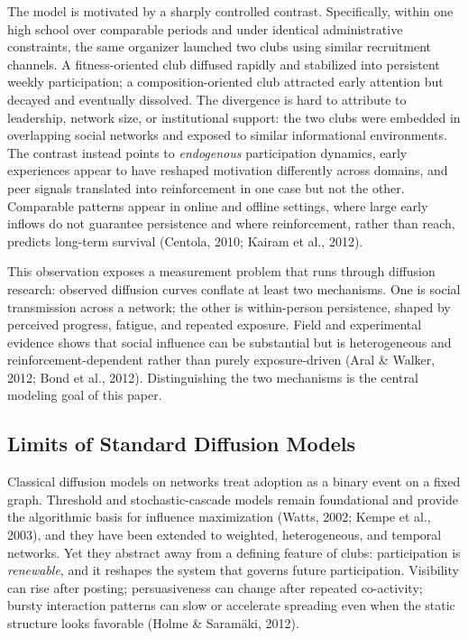 \documentclass[11pt]{article}
\begin{document}
The model is motivated by a sharply controlled contrast. Specifically, within one high school over comparable periods and under identical administrative constraints, the same organizer launched two clubs using similar recruitment channels. A fitness-oriented club diffused rapidly and stabilized into persistent weekly participation; a composition-oriented club attracted early attention but decayed and eventually dissolved. The divergence is hard to attribute to leadership, network size, or institutional support: the two clubs were embedded in overlapping social networks and exposed to similar informational environments. The contrast instead points to \emph{endogenous} participation dynamics, early experiences appear to have reshaped motivation differently across domains, and peer signals translated into reinforcement in one case but not the other. Comparable patterns appear in online and offline settings, where large early inflows do not guarantee persistence and where reinforcement, rather than reach, predicts long-term survival (Centola, 2010; Kairam et al., 2012).

This observation exposes a measurement problem that runs through diffusion research: observed diffusion curves conflate at least two mechanisms. One is social transmission across a network; the other is within-person persistence, shaped by perceived progress, fatigue, and repeated exposure. Field and experimental evidence shows that social influence can be substantial but is heterogeneous and reinforcement-dependent rather than purely exposure-driven (Aral \& Walker, 2012; Bond et al., 2012). Distinguishing the two mechanisms is the central modeling goal of this paper.

\subsection{Limits of Standard Diffusion Models}
Classical diffusion models on networks treat adoption as a binary event on a fixed graph. Threshold and stochastic-cascade models remain foundational and provide the algorithmic basis for influence maximization (Watts, 2002; Kempe et al., 2003), and they have been extended to weighted, heterogeneous, and temporal networks. Yet they abstract away from a defining feature of clubs: participation is \emph{renewable}, and it reshapes the system that governs future participation. Visibility can rise after posting; persuasiveness can change after repeated co-activity; bursty interaction patterns can slow or accelerate spreading even when the static structure looks favorable (Holme \& Saram\"aki, 2012).
\end{document}
